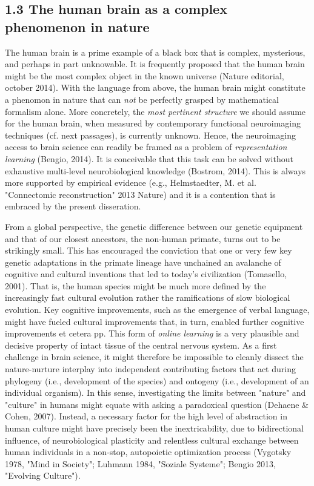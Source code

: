 \documentclass[authoryear,review,3p]{elsarticle}
\begin{document}
\subsection*{1.3 The human brain as a complex phenomenon in nature}
The human brain is a prime example of
a black box that is complex, mysterious, and perhaps in part unknowable.
It is frequently proposed that
the human brain might be the most complex object in the known universe
(Nature editorial, october 2014).
With the language from above,
the human brain might constitute a phenomon in nature that
can \textit{not} be perfectly grasped by mathematical formalism alone.
More concretely,
the \textit{most pertinent structure} we should assume for the human brain,
when measured by
contemporary functional neuroimaging techniques (cf. next passages),
is currently unknown.
Hence, the neuroimaging access to brain science can readily be framed as
a problem of \textit{representation learning} (Bengio, 2014).
It is conceivable
that this task can be solved without exhaustive
multi-level neurobiological knowledge (Bostrom, 2014).
This is always more supported by empirical evidence
(e.g., Helmstaedter, M. et al. "Connectomic reconstruction" 2013 Nature)
and
it is a contention that is embraced by the present disseration.


From a global perspective,
the genetic difference between our genetic equipment and that
of our closest ancestors, the non-human primate, turns out to be 
strikingly small.
This has encouraged the conviction that one or very few key genetic
adaptations in the primate lineage have unchained an avalanche
of cognitive and cultural inventions that led to today's civilization
(Tomasello, 2001).
That is, the human species might be much more defined by the
increasingly fast cultural evolution rather the ramifications
of slow biological evolution.
Key cognitive improvements, such as the emergence of verbal language,
might have fueled cultural improvements that, in turn, enabled
further cognitive improvements et cetera pp.
This form of \textit{online learning} is a very plausible and decisive
property of intact tissue of the central nervous system.
%
As a first challenge in brain science,
it might therefore be impossible to cleanly dissect
the nature-nurture interplay into independent contributing factors that act
during
phylogeny (i.e., development of the species)
and
ontogeny (i.e., development of an individual organism).
%
In this sense,
investigating the limits between "nature" and "culture" in humans
might equate with asking a paradoxical question
(Dehaene \& Cohen, 2007).
%
Instead,
a necessary factor for the high level of abstraction in human culture
might have precisely been the inextricability, due to bidirectional influence, of
neurobiological plasticity and relentless cultural exchange
between human individuals
in a non-stop, autopoietic optimization process
(Vygotsky 1978, "Mind in Society"; Luhmann 1984, "Soziale Systeme";
Bengio 2013, "Evolving Culture").
\end{document}
